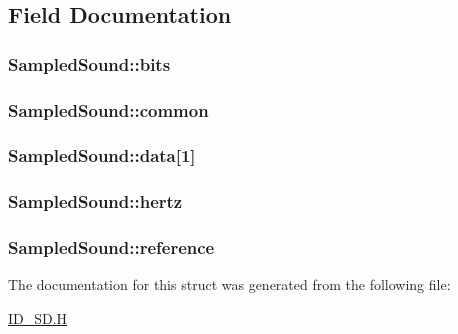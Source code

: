 \subsection{Field Documentation}
\hypertarget{structSampledSound_af2a0487386cdea8b6af25d39e4009162}{
\subsubsection[{bits}]{ {\bf SampledSound::bits}}}
\label{structSampledSound_af2a0487386cdea8b6af25d39e4009162}
\hypertarget{structSampledSound_a7a8be674d5909a31a52a8a8a21c1d9a6}{
\subsubsection[{common}]{ {\bf SampledSound::common}}}
\label{structSampledSound_a7a8be674d5909a31a52a8a8a21c1d9a6}
\hypertarget{structSampledSound_ab769b22938724a786e2cc1e607f1a455}{
\subsubsection[{data}]{ {\bf SampledSound::data}\mbox{[}1\mbox{]}}}
\label{structSampledSound_ab769b22938724a786e2cc1e607f1a455}
\hypertarget{structSampledSound_ae530eb7fb4ee3671108827bab2ff7f11}{
\subsubsection[{hertz}]{ {\bf SampledSound::hertz}}}
\label{structSampledSound_ae530eb7fb4ee3671108827bab2ff7f11}
\hypertarget{structSampledSound_ad3803486b4766eff251021eca16b89e2}{
\subsubsection[{reference}]{ {\bf SampledSound::reference}}}
\label{structSampledSound_ad3803486b4766eff251021eca16b89e2}


The documentation for this struct was generated from the following file:\begin{DoxyCompactItemize}
\item 
\hyperlink{ID__SD_8H}{ID\_\-SD.H}\end{DoxyCompactItemize}
